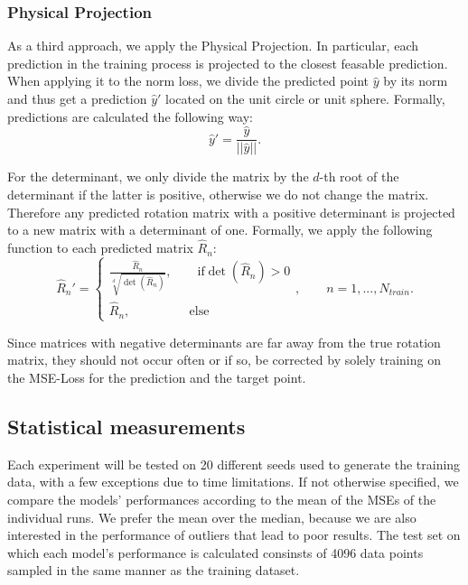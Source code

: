 \subsubsection{Physical Projection}
\label{sec:phys_proj}
As a third approach, we apply the Physical Projection. In particular, each prediction in the training process is projected to the closest feasable prediction. When applying it to the norm loss, we divide the predicted point $\hat{y}$ by its norm and thus get a prediction $\hat{y}'$ located on the unit circle or unit sphere. Formally, predictions are calculated the following way:
\begin{equation}
\hat{y}' = \frac{\hat{y}}{||\hat{y}||}.
\end{equation}

For the determinant, we only divide the matrix by the $d$-th root of the determinant if the latter is positive, otherwise we do not change the matrix. Therefore any predicted rotation matrix with a positive determinant is projected to a new matrix with a determinant of one. Formally, we apply the following function to each predicted matrix $\hat{R}_n$:
\begin{equation}
\hat{R}_n' = \begin{cases} \frac{\hat{R}_n}{\sqrt[d]{\det(\hat{R}_n)}}, \qquad \text{if} \det(\hat{R}_n) > 0 \\ \hat{R}_n, \qquad \qquad \,\,\,\,\text{else} \end{cases}, \qquad n = 1, ..., N_{train}.
\label{eq:norm_det}
\end{equation}

Since matrices with negative determinants are far away from the true rotation matrix, they should not occur often or if so, be corrected by solely training on the MSE-Loss for the prediction and the target point. 

\subsection{Statistical measurements}
Each experiment will be tested on 20 different seeds used to generate the training data, with a few exceptions due to time limitations. If not otherwise specified, we compare the models' performances according to the mean of the MSEs of the individual runs. We prefer the mean over the median, because we are also interested in the performance of outliers that lead to poor results. The test set on which each model's performance is calculated consinsts of 4096 data points sampled in the same manner as the training dataset.\\



\[   \]








\clearpage

